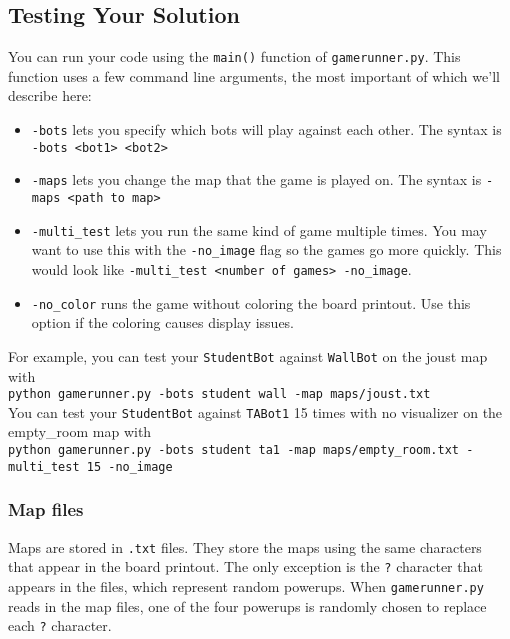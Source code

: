 \documentclass{article}
\begin{document}
    \subsection{Testing Your Solution}
    You can run your code using the \texttt{main()} function of \texttt{gamerunner.py}. This function uses a few command line arguments, the most important of which we'll describe here:
    \begin{itemize}
        \item \texttt{-bots} lets you specify which bots will play against each other. The syntax is \texttt{-bots <bot1> <bot2>}
        \item \texttt{-maps} lets you change the map that the game is played on. The syntax is \texttt{-maps <path to map>}
        \item \texttt{-multi\_test} lets you run the same kind of game multiple times. You may want to use this with the \texttt{-no\_image} flag so the games go more quickly. This would look like \texttt{-multi\_test <number of games> -no\_image}.
        \item \texttt{-no\_color} runs the game without coloring the board printout. Use this option if the coloring causes display issues.
    \end{itemize}
    For example, you can test your \texttt{StudentBot} against \texttt{WallBot} on the joust map with \\

    \texttt{python gamerunner.py -bots student wall -map maps/joust.txt} \\

    You can test your \texttt{StudentBot} against \texttt{TABot1} 15 times with no visualizer on the empty\_room map with\\

    \texttt{python gamerunner.py -bots student ta1 -map
    maps/empty\_room.txt -multi\_test 15 -no\_image}

    \subsubsection{Map files}
    Maps are stored in \texttt{.txt} files. They store the maps using the same characters that appear in the board printout. The only exception is the \texttt{?} character that appears in the files, which represent random powerups. When \texttt{gamerunner.py} reads in the map files, one of the four powerups is randomly chosen to replace each \texttt{?} character.
\end{document}

